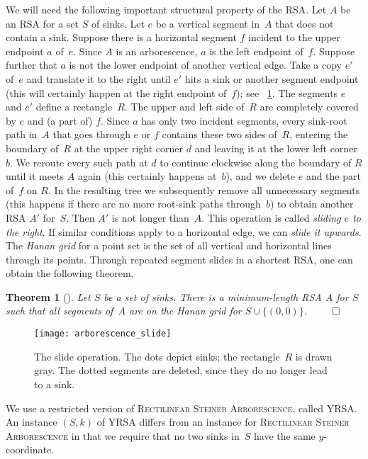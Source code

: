 \documentclass[a4paper,11pt]{article}
\newtheorem{theorem}{Theorem}[section]
\newcommand{\noproof}{~\hfill$\qed$}
\newcommand{\ShoLong}[2]{#2}
\begin{document}
We will need the following important structural property of the RSA.
Let $A$ be an RSA for a set $S$ of sinks. 
Let $e$ be a vertical segment in~$A$ that does not contain a sink. 
Suppose there is a horizontal segment $f$ incident to the upper endpoint $a$ of~$e$.
Since $A$ is an arborescence, $a$ is the left endpoint of~$f$.
Suppose further that $a$ is not the lower endpoint of another vertical edge.
Take a copy $e'$ of~$e$ and translate it to the right until $e'$ hits a sink 
or another segment endpoint (this will certainly happen at the right
endpoint of~$f$); see \figurename~\ref{fig_arborescence_slide}.
The segments $e$ and $e'$ define a rectangle~$R$.
The upper and left side of~$R$ are completely covered by $e$ and (a part of) $f$.
Since $a$ has only two incident segments, every sink-root path in~$A$ that goes through 
$e$ or $f$ contains these two sides of~$R$, entering the boundary of~$R$ 
at the upper right corner $d$ and leaving it at the lower left corner~$b$.
We reroute every such path at $d$ to continue clockwise along the boundary of 
$R$ until it meets $A$ again (this certainly happens at~$b$), and we 
delete $e$ and the part of~$f$ on $R$.
In the resulting tree we subsequently remove all unnecessary 
segments (this happens if there are no more root-sink paths through~$b$) 
to obtain another RSA $A'$ for~$S$.
Then $A'$ is not longer than~$A$.
This operation is called \emph{sliding $e$ to the right}.
If similar conditions apply to a horizontal edge, we can \emph{slide it upwards}.
The \emph{Hanan grid} for a point set is the set of all vertical and horizontal 
lines through its points.
Through repeated segment slides in a shortest RSA, one
can obtain the following theorem.
\begin{theorem}[\cite{rao}]\label{thm_slide}
Let $S$ be a set of sinks. There is a minimum-length RSA $A$ for
$S$ such that
all segments of~$A$ are on the Hanan
grid for $S \cup \{(0,0)\}$.\noproof
\end{theorem}
\begin{figure}
\centering
\texttt{[image: arborescence\_slide]}
\caption{The slide operation. The dots depict sinks; the 
rectangle~$R$ is drawn gray.
The dotted segments are deleted, since they do no longer lead to a sink.
}
\label{fig_arborescence_slide}
\end{figure}

We use a restricted version of \textsc{Rectilinear Steiner Arborescence}, 
called YRSA.
An instance $(S, k)$ of YRSA differs from an instance for \textsc{Rectilinear
  Steiner Arborescence}
in that we require that no two sinks in~$S$ have the 
same $y$-coordinate.
\ShoLong{The NP-hardness of YRSA follows by a simple perturbation argument; 
see the full version for all omitted proofs.}
{}
\end{document}
